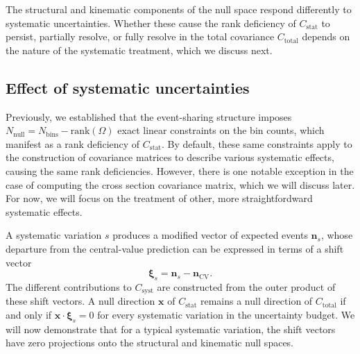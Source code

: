 \documentclass[a4paper,11pt]{article}
\begin{document}
The structural and kinematic components of the null space respond differently to systematic uncertainties. Whether these cause the rank deficiency of $C_{\text{stat}}$ to persist, partially resolve, or fully resolve in the total covariance $C_{\text{total}}$ depends on the nature of the systematic treatment, which we discuss next.

\subsection{Effect of systematic uncertainties}
\label{subsec:systematics}

Previously, we established that the event-sharing structure imposes $N_{\text{null}} = N_{\text{bins}} - \mathrm{rank}(\Omega)$ exact linear constraints on the bin counts, which manifest as a rank deficiency of $C_{\text{stat}}$. By default, these same constraints apply to the construction of covariance matrices to describe various systematic effects, causing the same rank deficiencies. However, there is one notable exception in the case of computing the cross section covariance matrix, which we will discuss later. For now, we will focus on the treatment of other, more straightfordward systematic effects.

A systematic variation $s$ produces a modified vector of expected events $\mathbf{n}_{s}$, whose departure from the central-value prediction can be expressed in terms of a shift vector
\begin{equation}
    \boldsymbol{\xi}_{s} = \mathbf{n}_{s} - \mathbf{n}_{\text{CV}}.
\end{equation}
The different contributions to $C_{\text{syst}}$ are constructed from the outer product of these shift vectors. A null direction $\mathbf{x}$ of $C_{\text{stat}}$ remains a null direction of $C_{\text{total}}$ if and only if $\mathbf{x} \cdot \boldsymbol{\xi}_{s} = 0$ for every systematic variation in the uncertainty budget. We will now demonstrate that for a typical systematic variation, the shift vectors have zero projections onto the structural and kinematic null spaces.
\end{document}
